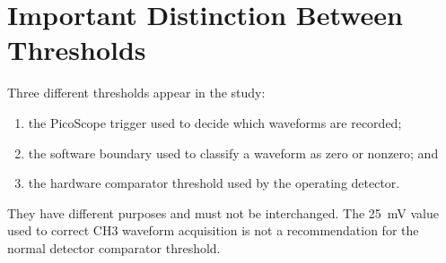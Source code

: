 \section{Important Distinction Between Thresholds}

Three different thresholds appear in the study:

\begin{enumerate}[leftmargin=*]
  \item the PicoScope trigger used to decide which waveforms are recorded;
  \item the software boundary used to classify a waveform as zero or nonzero; and
  \item the hardware comparator threshold used by the operating detector.
\end{enumerate}

They have different purposes and must not be interchanged. The \SI{25}{\milli\volt} value used to correct CH3 waveform acquisition is not a recommendation for the normal detector comparator threshold.
